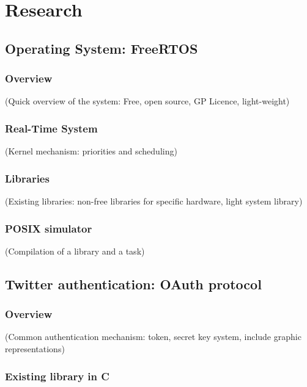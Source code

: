 \chapter{Research}\label{chap:research}

\section{Operating System: FreeRTOS}

\subsection{Overview}

(Quick overview of the system: Free, open source, GP Licence, light-weight)


\subsection{Real-Time System}

(Kernel mechanism: priorities and scheduling)


\subsection{Libraries}

(Existing libraries: non-free libraries for specific hardware, light system library)


\subsection{POSIX simulator}

(Compilation of a library and a task)



\section{Twitter authentication: OAuth protocol}

\subsection{Overview}

(Common authentication mechanism: token, secret key system, include graphic representations)


\subsection{Existing library in C}

